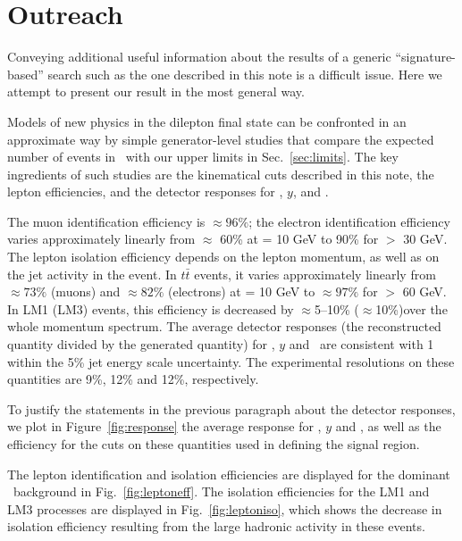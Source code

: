 \section{Outreach}
\label{sec:outreach}
Conveying additional useful information about the results of
a generic ``signature-based'' search such as the one described
in this note is a difficult issue.  
Here we attempt to present our result in the most general 
way.

Models of new physics in the dilepton final state 
can be confronted in an approximate way by simple 
generator-level studies that 
compare the expected number of events in \lumi\
with our upper limits in Sec.~\ref{sec:limits}.  The key ingredients
of such studies are the kinematical cuts described 
in this note, the lepton efficiencies, and the detector
responses for \Ht, $y$, and \met.

The muon identification efficiency is $\approx 96\%$;
the electron identification efficiency varies approximately linearly from $\approx$ 60\% at 
\pt = 10 GeV to 90\% for \pt $>$ 30 GeV.  
%
The lepton isolation efficiency depends on the lepton momentum, as well as on the jet activity in the 
event.
In $t\bar{t}$ events, it varies approximately linearly from $\approx 73\%$ (muons)
and $\approx 82\%$ (electrons) at \pt = 10 GeV to $\approx 97\%$ for \pt $>$ 60 GeV. 
In LM1 (LM3) events, this efficiency is decreased by $\approx$5--10\% ($\approx$10\%)over the whole momentum spectrum.
%
The average detector responses (the reconstructed quantity divided by the generated quantity) 
for \Ht, $y$ and \met\ are consistent with 1 within the 5\% jet energy scale uncertainty.
The experimental resolutions on these quantities are 9\%, 12\% and 12\%, respectively.

To justify the statements in the previous paragraph 
about the detector responses, we plot 
in Figure~\ref{fig:response} the average response for 
\Ht, $y$ and \met, as well as the
efficiency for the cuts on these quantities used in defining the
signal region.

The lepton identification and isolation efficiencies are displayed for the dominant
\ttbar\ background in Fig.~\ref{fig:leptoneff}. The isolation efficiencies for the LM1
and LM3 processes are displayed in Fig.~\ref{fig:leptoniso}, which shows the decrease
in isolation efficiency resulting from the large hadronic activity in these events.




